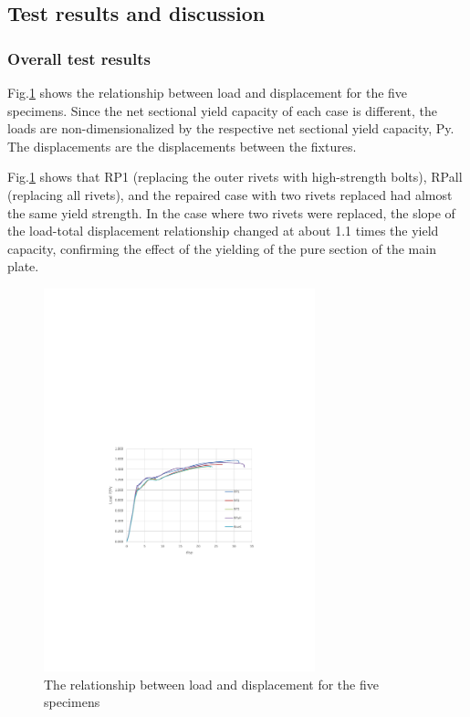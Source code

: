 \subsection{Test results and discussion}

\subsubsection{Overall test results}

Fig.\ref{fig-3-10} shows the relationship between load and displacement for the five specimens. Since the net sectional yield capacity of each case is different, the loads are non-dimensionalized by the respective net sectional yield capacity, Py. The displacements are the displacements between the fixtures.

Fig.\ref{fig-3-10} shows that RP1 (replacing the outer rivets with high-strength bolts), RPall (replacing all rivets), and the repaired case with two rivets replaced had almost the same yield strength. In the case where two rivets were replaced, the slope of the load-total displacement relationship changed at about 1.1 times the yield capacity, confirming the effect of the yielding of the pure section of the main plate.

\begin{figure}[htbp]
    \centering
    \includegraphics[width=0.7\textwidth]{imgs/ch3/fig3-10.pdf}
    \caption{The relationship between load and displacement for the five specimens}
    \label{fig-3-10}
\end{figure}

